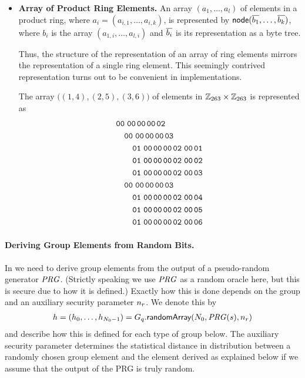 \documentclass[11pt]{article}
\begin{document}
\begin{itemize}
\item\textbf{Array of Product Ring Elements.} An array
  $(a_1,\ldots,a_l)$ of elements in a product ring, where
  $a_i=(a_{i,1},\ldots,a_{i,k})$, is represented by
  $\textsf{node}(\overline{b_1},\ldots,\overline{b_k})$, where $b_i$ is the array
  $(a_{1,i},\ldots,a_{l,i})$ and $\overline{b_i}$ is its representation as a
  byte tree.

  Thus, the structure of the representation of an array of ring
  elements mirrors the representation of a single ring element. This
  seemingly contrived representation turns out to be convenient in
  implementations.

  \begin{example}
    The array $\big((1,4),(2,5),(3,6)\big)$ of elements in
    $\mathbb{Z}_{263}\times\mathbb{Z}_{263}$ is represented as
    \begin{align*}
      &\hex{00\cutt00\cut00\cut00\cut02}\\
      &\quad\hex{00\cutt00\cut00\cut00\cut03}\\
      &\quad\quad\hex{01\cutt00\cut00\cut00\cut02\cutt00\cut01}\\
      &\quad\quad\hex{01\cutt00\cut00\cut00\cut02\cutt00\cut02}\\
      &\quad\quad\hex{01\cutt00\cut00\cut00\cut02\cutt00\cut03}\\
      &\quad\hex{00\cutt00\cut00\cut00\cut03}\\
      &\quad\quad\hex{01\cutt00\cut00\cut00\cut02\cutt00\cut04}\\
      &\quad\quad\hex{01\cutt00\cut00\cut00\cut02\cutt00\cut05}\\
      &\quad\quad\hex{01\cutt00\cut00\cut00\cut02\cutt00\cut06}
    \end{align*}
  \end{example}



\end{itemize}


\paragraph{Deriving Group Elements from Random Bits.}

In  we need to derive group elements from the output
of a pseudo-random generator $\mathit{PRG}$. (Strictly speaking we use $\mathit{PRG}$
as a random oracle here, but this is secure due to how it is defined.)
Exactly how this is done depends on the group and an auxiliary
security parameter $n_r$. We denote this by
\begin{align*}
  h=(h_{0},\ldots,h_{N_{0}-1})=G_{q}.\textsf{randomArray}(N_{0},\mathit{PRG}(s),n_r)
\end{align*}
and describe how this is defined for each type of group below. The
auxiliary security parameter determines the statistical distance in
distribution between a randomly chosen group element and the element
derived as explained below if we assume that the output of the PRG is
truly random.
\end{document}
